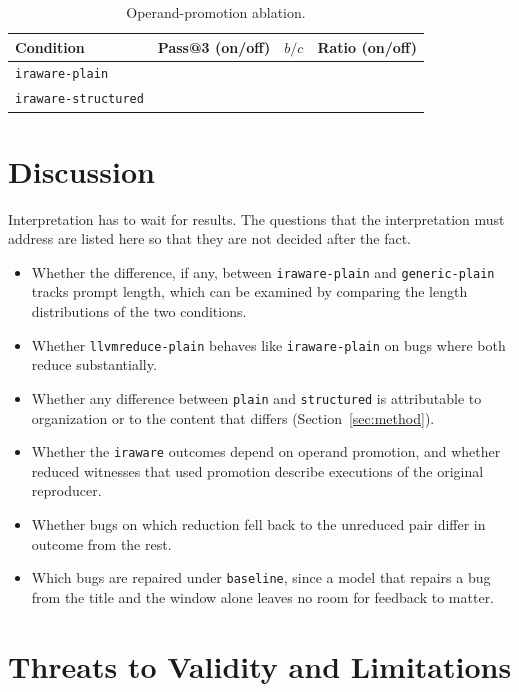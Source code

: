 \documentclass[conference]{IEEEtran}
\newcommand{\cn}[1]{\texttt{#1}}   %
\begin{document}
\begin{table}[t]
\caption{Operand-promotion ablation.}
\label{tab:ablation}
\centering\footnotesize
\begin{tabular}{@{}lccc@{}}
\toprule
Condition & Pass@3 (on/off) & $b/c$ & Ratio (on/off) \\
\midrule
\cn{iraware-plain} &  &  &  \\
\cn{iraware-structured} &  &  &  \\
\bottomrule
\end{tabular}
\end{table}

\section{Discussion}

Interpretation has to wait for results. The questions that the interpretation must address are listed here so that they are not decided after the fact.
\begin{itemize}
\item Whether the difference, if any, between \cn{iraware-plain} and \cn{generic-plain} tracks prompt length, which can be examined by comparing the length distributions of the two conditions.
\item Whether \cn{llvmreduce-plain} behaves like \cn{iraware-plain} on bugs where both reduce substantially.
\item Whether any difference between \cn{plain} and \cn{structured} is attributable to organization or to the content that differs (Section~\ref{sec:method}).
\item Whether the \cn{iraware} outcomes depend on operand promotion, and whether reduced witnesses that used promotion describe executions of the original reproducer.
\item Whether bugs on which reduction fell back to the unreduced pair differ in outcome from the rest.
\item Which bugs are repaired under \cn{baseline}, since a model that repairs a bug from the title and the window alone leaves no room for feedback to matter.
\end{itemize}

\section{Threats to Validity and Limitations}
\label{sec:threats}
\end{document}
